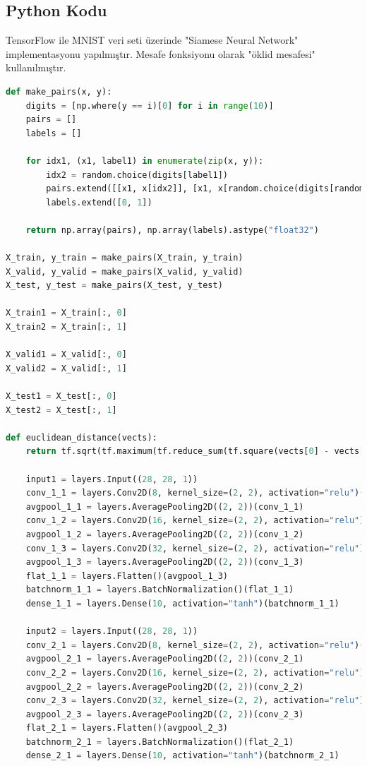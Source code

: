\subsection{Python Kodu}

TensorFlow ile MNIST veri seti üzerinde "Siamese Neural Network" implementasyonu yapılmıştır. Mesafe fonksiyonu olarak "öklid mesafesi" kullanılmıştır.

\begin{lstlisting}[language=Python]
def make_pairs(x, y):
    digits = [np.where(y == i)[0] for i in range(10)]
    pairs = []
    labels = []

    for idx1, (x1, label1) in enumerate(zip(x, y)):
        idx2 = random.choice(digits[label1])
        pairs.extend([[x1, x[idx2]], [x1, x[random.choice(digits[random.choice([i for i in range(10) if i != label1])])]]])
        labels.extend([0, 1])

    return np.array(pairs), np.array(labels).astype("float32")

X_train, y_train = make_pairs(X_train, y_train)
X_valid, y_valid = make_pairs(X_valid, y_valid)
X_test, y_test = make_pairs(X_test, y_test)

X_train1 = X_train[:, 0]
X_train2 = X_train[:, 1]

X_valid1 = X_valid[:, 0]
X_valid2 = X_valid[:, 1]

X_test1 = X_test[:, 0]
X_test2 = X_test[:, 1]

def euclidean_distance(vects):
    return tf.sqrt(tf.maximum(tf.reduce_sum(tf.square(vects[0] - vects[1]), axis=1, keepdims=True), tf.keras.backend.epsilon()))

    input1 = layers.Input((28, 28, 1))
    conv_1_1 = layers.Conv2D(8, kernel_size=(2, 2), activation="relu")(input1)
    avgpool_1_1 = layers.AveragePooling2D((2, 2))(conv_1_1)
    conv_1_2 = layers.Conv2D(16, kernel_size=(2, 2), activation="relu")(avgpool_1_1)
    avgpool_1_2 = layers.AveragePooling2D((2, 2))(conv_1_2)
    conv_1_3 = layers.Conv2D(32, kernel_size=(2, 2), activation="relu")(avgpool_1_2)
    avgpool_1_3 = layers.AveragePooling2D((2, 2))(conv_1_3)
    flat_1_1 = layers.Flatten()(avgpool_1_3)
    batchnorm_1_1 = layers.BatchNormalization()(flat_1_1)
    dense_1_1 = layers.Dense(10, activation="tanh")(batchnorm_1_1)
    
    input2 = layers.Input((28, 28, 1))
    conv_2_1 = layers.Conv2D(8, kernel_size=(2, 2), activation="relu")(input2)
    avgpool_2_1 = layers.AveragePooling2D((2, 2))(conv_2_1)
    conv_2_2 = layers.Conv2D(16, kernel_size=(2, 2), activation="relu")(avgpool_2_1)
    avgpool_2_2 = layers.AveragePooling2D((2, 2))(conv_2_2)
    conv_2_3 = layers.Conv2D(32, kernel_size=(2, 2), activation="relu")(avgpool_2_2)
    avgpool_2_3 = layers.AveragePooling2D((2, 2))(conv_2_3)
    flat_2_1 = layers.Flatten()(avgpool_2_3)
    batchnorm_2_1 = layers.BatchNormalization()(flat_2_1)
    dense_2_1 = layers.Dense(10, activation="tanh")(batchnorm_2_1)
    

\end{lstlisting}
